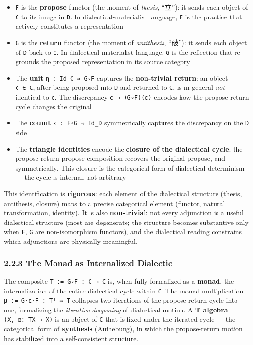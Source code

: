 \documentclass[
]{article}
\providecommand{\tightlist}{%
  \setlength{\itemsep}{0pt}\setlength{\parskip}{0pt}}
\begin{document}
\begin{itemize}
\tightlist
\item
  \texttt{F} is the \textbf{propose} functor (the moment of
  \emph{thesis}, ``立''): it sends each object of \texttt{C} to its
  image in \texttt{D}. In dialectical-materialist language, \texttt{F}
  is the practice that actively constitutes a representation
\item
  \texttt{G} is the \textbf{return} functor (the moment of
  \emph{antithesis}, ``破''): it sends each object of \texttt{D} back to
  \texttt{C}. In dialectical-materialist language, \texttt{G} is the
  reflection that re-grounds the proposed representation in its source
  category
\item
  The \textbf{unit} \texttt{η\ :\ Id\_C\ ⇒\ G∘F} captures the
  \textbf{non-trivial return}: an object \texttt{c\ ∈\ C}, after being
  proposed into \texttt{D} and returned to \texttt{C}, is in general
  \emph{not} identical to \texttt{c}. The discrepancy
  \texttt{c\ →\ (G∘F)(c)} encodes how the propose-return cycle changes
  the original
\item
  The \textbf{counit} \texttt{ε\ :\ F∘G\ ⇒\ Id\_D} symmetrically
  captures the discrepancy on the \texttt{D} side
\item
  The \textbf{triangle identities} encode the \textbf{closure of the
  dialectical cycle}: the propose-return-propose composition recovers
  the original propose, and symmetrically. This closure is the
  categorical form of dialectical determinism --- the cycle is internal,
  not arbitrary
\end{itemize}

This identification is \textbf{rigorous}: each element of the
dialectical structure (thesis, antithesis, closure) maps to a precise
categorical element (functor, natural transformation, identity). It is
also \textbf{non-trivial}: not every adjunction is a useful dialectical
structure (most are degenerate; the structure becomes substantive only
when \texttt{F}, \texttt{G} are non-isomorphism functors), and the
dialectical reading constrains which adjunctions are physically
meaningful.

\hypertarget{the-monad-as-internalized-dialectic}{%
\subsubsection{2.2.3 The Monad as Internalized
Dialectic}\label{the-monad-as-internalized-dialectic}}

The composite \texttt{T\ :=\ G∘F\ :\ C\ →\ C} is, when fully formalized
as a \textbf{monad}, the internalization of the entire dialectical cycle
within \texttt{C}. The monad multiplication
\texttt{μ\ :=\ G·ε·F\ :\ T²\ ⇒\ T} collapses two iterations of the
propose-return cycle into one, formalizing the \emph{iterative
deepening} of dialectical motion. A \textbf{T-algebra}
\texttt{(X,\ α:\ TX\ →\ X)} is an object of \texttt{C} that is fixed
under the iterated cycle --- the categorical form of \textbf{synthesis}
(Aufhebung), in which the propose-return motion has stabilized into a
self-consistent structure.
\end{document}
